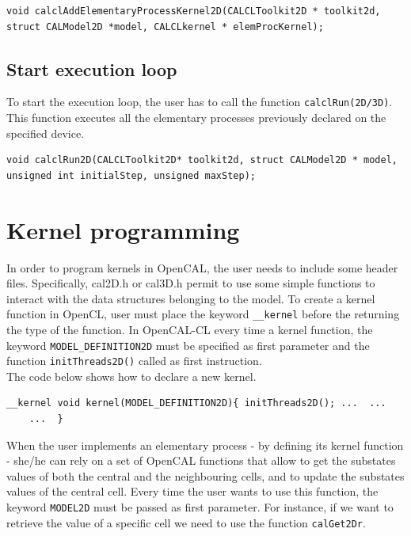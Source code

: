 \begin{lstlisting}
void calclAddElementaryProcessKernel2D(CALCLToolkit2D * toolkit2d,
struct CALModel2D *model, CALCLkernel * elemProcKernel);
\end{lstlisting}


\subsection{Start execution loop}

To start the execution loop, the user has to call the function
\verb'calclRun(2D/3D)'. This function executes all the elementary
processes previously declared on the specified device.

\begin{lstlisting}
void calclRun2D(CALCLToolkit2D* toolkit2d, struct CALModel2D * model,
unsigned int initialStep, unsigned maxStep);
\end{lstlisting}


\section{Kernel programming} 

In order to program kernels in OpenCAL, the user needs to include some header files.
Specifically, cal2D.h or cal3D.h permit to use some simple
functions to interact with the data structures belonging to the model.
To create a kernel function in OpenCL, user must place the keyword
\verb'__kernel' before the returning the type of the function. In
OpenCAL-CL every time a kernel function, the keyword \verb'MODEL_DEFINITION2D' must be specified as first parameter and the
function \verb'initThreads2D()' called as first instruction.\\ The code below
shows how to declare a new kernel.

\begin{lstlisting} 
__kernel void kernel(MODEL_DEFINITION2D){ initThreads2D(); ...  ...
    ...  }
\end{lstlisting}

When the user implements an elementary process - by defining
its kernel function - she/he can rely on a set of OpenCAL functions
that allow to get the substates values of both the central and the
neighbouring cells, and to update the substates values of the central
cell. Every time the user wants to use this function, the keyword \verb'MODEL2D' must be passed
as first parameter. For instance, if we
want to retrieve the value of a specific cell we need to use the function
\verb'calGet2Dr'.

